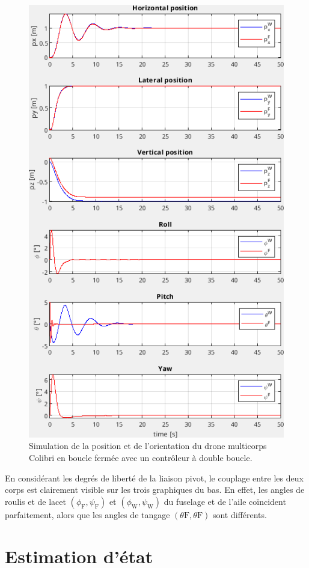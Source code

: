 \begin{figure}[ht!]
\centering
    \includegraphics[width=0.6\columnwidth,angle=0]{figures/colibri_sim.png}
    \caption{Simulation de la position et de l'orientation du drone multicorps Colibri en boucle fermée avec un contrôleur à double boucle. }
    \label{fig:sim_colibri}
\end{figure}

En considérant les degrés de liberté de la liaison pivot, le couplage entre les deux corps est clairement visible sur les trois graphiques du bas. En effet, les angles de roulis et de lacet $(\phi_{\text{F}}, \psi_{\text{F}})$ et $(\phi_{\text{W}}, \psi_{\text{W}})$ du fuselage et de l'aile coïncident parfaitement, alors que les angles de tangage $(\theta{\text{F}}, \theta{\text{F}})$ sont différents.








\section{Estimation d'état}\label{sec:stateEst}



